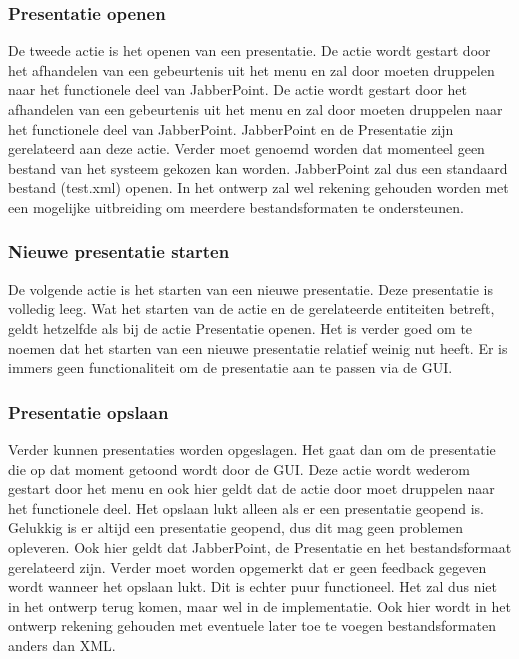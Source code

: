 \documentclass[a4paper]{article}
\newcommand{\1}[0]{\'{e}\'{e}n}
\begin{document}
\subsubsection{Presentatie openen}
\label{subsub:presOpenen}
De tweede actie is het openen van een presentatie. De actie wordt gestart door het afhandelen van een gebeurtenis uit het menu en zal door moeten druppelen naar het functionele deel van JabberPoint. De actie wordt gestart door het afhandelen van een gebeurtenis uit het menu en zal door moeten druppelen naar het functionele deel van JabberPoint. JabberPoint en de Presentatie zijn gerelateerd aan deze actie. Verder moet genoemd worden dat momenteel geen bestand van het systeem gekozen kan worden. JabberPoint zal dus een standaard bestand (test.xml) openen. In het ontwerp zal wel rekening gehouden worden met een mogelijke uitbreiding om meerdere bestandsformaten te ondersteunen.

\subsubsection{Nieuwe presentatie starten}
De volgende actie is het starten van een nieuwe presentatie. Deze presentatie is volledig leeg. Wat het starten van de actie en de gerelateerde entiteiten betreft, geldt hetzelfde als bij de actie Presentatie openen. Het is verder goed om te noemen dat het starten van een nieuwe presentatie relatief weinig nut heeft. Er is immers geen functionaliteit om de presentatie aan te passen via de GUI.

\subsubsection{Presentatie opslaan}
Verder kunnen presentaties worden opgeslagen. Het gaat dan om de presentatie die op dat moment getoond wordt door de GUI. Deze actie wordt wederom gestart door het menu en ook hier geldt dat de actie door moet druppelen naar het functionele deel. Het opslaan lukt alleen als er een presentatie geopend is. Gelukkig is er altijd een presentatie geopend, dus dit mag geen problemen opleveren. Ook hier geldt dat JabberPoint, de Presentatie en het bestandsformaat gerelateerd zijn. Verder moet worden opgemerkt dat er geen feedback gegeven wordt wanneer het opslaan lukt. Dit is echter puur functioneel. Het zal dus niet in het ontwerp terug komen, maar wel in de implementatie. Ook hier wordt in het ontwerp rekening gehouden met eventuele later toe te voegen bestandsformaten anders dan XML.
\end{document}
